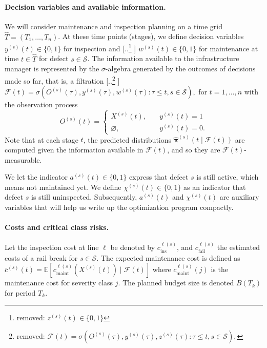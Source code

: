 \documentclass{article}
\providecommand{\DIFadd}[1]{{\protect\color{blue} \sf #1}} %
\providecommand{\DIFdel}[1]{{\protect\color{red} [..\footnote{removed: #1} ]}} %
\providecommand{\DIFaddbegin}{} %
\providecommand{\DIFaddend}{} %
\providecommand{\DIFdelbegin}{} %
\providecommand{\DIFdelend}{} %
\begin{document}
\paragraph{Decision variables and available information.}
We will consider maintenance and inspection planning on a time grid $\widehat T=(T_1,\dots,T_n)$.
At these time points (stages), we define decision variables 
$y^{(s)}(t)\in\{0,1\}$ for inspection and \DIFdelbegin \DIFdel{$z^{(s)}(t)\in\{0,1\}$ }\DIFdelend \DIFaddbegin \DIFadd{$w^{(s)}(t)\in\{0,1\}$ }\DIFaddend for maintenance at time $t \in \widehat T$ for defect $s\in\mathcal S$.
The information available to the infrastructure manager is represented by the $\sigma$-algebra generated by the outcomes of decisions made so far, that is, a filtration
\DIFdelbegin \DIFdel{$
\mathcal F(t) = \sigma \left( O^{(s)}(\tau), y^{(s)}(\tau), z^{(s)}(\tau) : \tau \leq t, s\in\mathcal S \right), 
$
}\DIFdelend \DIFaddbegin \DIFadd{$
\mathcal F(t) = \sigma \left( O^{(s)}(\tau), y^{(s)}(\tau), w^{(s)}(\tau) : \tau \leq t, s\in\mathcal S \right), 
$
}\DIFaddend for $t = 1, \dots, n$ with the observation process 
$$
O^{(s)}(t) = \begin{cases}
X^{(s)}(t), \quad &y^{(s)}(t) = 1\\ 
\varnothing, \quad &y^{(s)}(t) = 0.
\end{cases}
$$
Note that at each stage $t$, the predicted distributions $\widehat{\bm \pi}^{(s)}(t \mid \mathcal F(t))$ are computed given the information available in $\mathcal F(t)$, and so they are $\mathcal F(t)$-measurable.

We let the indicator \(a^{(s)}(t)\in\{0,1\}\) express that defect \(s\) is still active, which means not maintained yet. We define \(\chi^{(s)}(t)\in\{0,1\}\) as an indicator that defect \(s\) is still uninspected. Subsequently, $a^{(s)}(t)$ and $\chi^{(s)}(t)$ are auxiliary variables that will help us write up the optimization program compactly.


\paragraph{Costs and critical class risks.}
Let the inspection cost at line $\ell$ be denoted by $c_{\text{ins}}^{\ell(s)}$, and $c_{\text{fail}}^{\ell(s)}$ the estimated costs of a rail break for $s \in \mathcal S$.
The expected maintenance cost is defined as 
$
\bar c^{(s)}(t) = \mathds E \left[ c_{\text{maint}}^{\ell(s)} \left(X^{(s)}(t)\right) \mid \mathcal F(t) \right]
$ where $c^{\ell(s)}_{\text{maint}}(j)$ is the maintenance cost for severity class $j$. \DIFaddbegin \DIFadd{The planned budget size is denoted $B(T_k)$ for period $T_k$.
}\DIFaddend 
\end{document}
